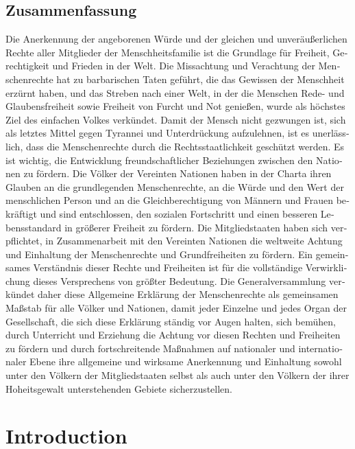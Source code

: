 \documentclass[
  titlepage,
  openright,
  DIV=calc,
  toc=listof,
  listof=nochaptergap]{scrbook}
\begin{document}
\begin{otherlanguage}{german}
\chapter*{Zusammenfassung}
\begin{spacing}{1.5}
Die Anerkennung der angeborenen Würde und der gleichen und unveräußerlichen Rechte aller Mitglieder der Menschheitsfamilie ist die Grundlage für Freiheit, Gerechtigkeit und Frieden in der Welt. Die Missachtung und Verachtung der Menschenrechte hat zu barbarischen Taten geführt, die das Gewissen der Menschheit erzürnt haben, und das Streben nach einer Welt, in der die Menschen Rede- und Glaubensfreiheit sowie Freiheit von Furcht und Not genießen, wurde als höchstes Ziel des einfachen Volkes verkündet. Damit der Mensch nicht gezwungen ist, sich als letztes Mittel gegen Tyrannei und Unterdrückung aufzulehnen, ist es unerlässlich, dass die Menschenrechte durch die Rechtsstaatlichkeit geschützt werden. Es ist wichtig, die Entwicklung freundschaftlicher Beziehungen zwischen den Nationen zu fördern. Die Völker der Vereinten Nationen haben in der Charta ihren Glauben an die grundlegenden Menschenrechte, an die Würde und den Wert der menschlichen Person und an die Gleichberechtigung von Männern und Frauen bekräftigt und sind entschlossen, den sozialen Fortschritt und einen besseren Lebensstandard in größerer Freiheit zu fördern. Die Mitgliedstaaten haben sich verpflichtet, in Zusammenarbeit mit den Vereinten Nationen die weltweite Achtung und Einhaltung der Menschenrechte und Grundfreiheiten zu fördern. Ein gemeinsames Verständnis dieser Rechte und Freiheiten ist für die vollständige Verwirklichung dieses Versprechens von größter Bedeutung. Die Generalversammlung verkündet daher diese Allgemeine Erklärung der Menschenrechte als gemeinsamen Maßstab für alle Völker und Nationen, damit jeder Einzelne und jedes Organ der Gesellschaft, die sich diese Erklärung ständig vor Augen halten, sich bemühen, durch Unterricht und Erziehung die Achtung vor diesen Rechten und Freiheiten zu fördern und durch fortschreitende Maßnahmen auf nationaler und internationaler Ebene ihre allgemeine und wirksame Anerkennung und Einhaltung sowohl unter den Völkern der Mitgliedstaaten selbst als auch unter den Völkern der ihrer Hoheitsgewalt unterstehenden Gebiete sicherzustellen.
\end{spacing}
\end{otherlanguage}

\renewcommand*\contentsname{Contents}
{
\hypersetup{linkcolor=}
\setcounter{tocdepth}{1}
\tableofcontents
}
\mainmatter
\hypertarget{sec:introduction}{%
\chapter{Introduction}\label{sec:introduction}}
\end{document}
